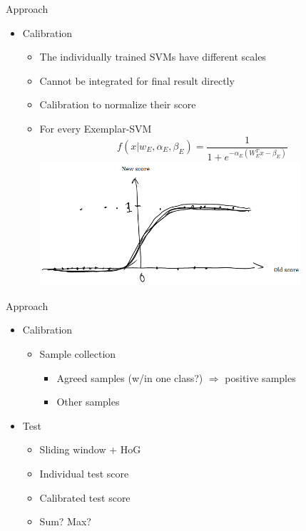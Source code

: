 \documentclass[12pt]{beamer}
\begin{document}
\begin{frame}{Approach}
	\begin{itemize}
		\item Calibration
		\begin{itemize}
			\item The individually trained SVMs have different scales
			\item Cannot be integrated for final result directly
			\item Calibration to normalize their score
			\item For every Exemplar-SVM
			\[f(x|w_E,\alpha_E,\beta_E) = \frac{1}{1 + e^{-\alpha_E(W_E^Tx-\beta_E)}}\]
			\includegraphics[width=0.8\textwidth]{esvm-calibration.png}
		\end{itemize}
	\end{itemize}
\end{frame}

\begin{frame}{Approach}
	\begin{itemize}
		\item Calibration
		\begin{itemize}
			\item Sample collection
			\begin{itemize}
				\item Agreed samples (w/in one class?) $\Rightarrow$ positive samples
				\item Other samples %
			\end{itemize}
		\end{itemize}
		\item Test
		\begin{itemize}
			\item Sliding window + HoG
			\item Individual test score
			\item Calibrated test score
			\item Sum? Max?
		\end{itemize}
	\end{itemize}
\end{frame}
\end{document}
